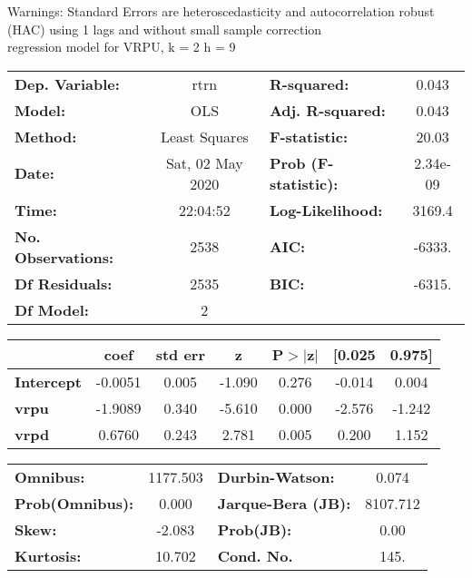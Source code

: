 Warnings: \newline
 [1] Standard Errors are heteroscedasticity and autocorrelation robust (HAC) using 1 lags and without small sample correction\\ 

regression model for VRPU, k = 2 h = 9\begin{center}
\begin{tabular}{lclc}
\toprule
\textbf{Dep. Variable:}    &       rtrn       & \textbf{  R-squared:         } &     0.043   \\
\textbf{Model:}            &       OLS        & \textbf{  Adj. R-squared:    } &     0.043   \\
\textbf{Method:}           &  Least Squares   & \textbf{  F-statistic:       } &     20.03   \\
\textbf{Date:}             & Sat, 02 May 2020 & \textbf{  Prob (F-statistic):} &  2.34e-09   \\
\textbf{Time:}             &     22:04:52     & \textbf{  Log-Likelihood:    } &    3169.4   \\
\textbf{No. Observations:} &        2538      & \textbf{  AIC:               } &    -6333.   \\
\textbf{Df Residuals:}     &        2535      & \textbf{  BIC:               } &    -6315.   \\
\textbf{Df Model:}         &           2      & \textbf{                     } &             \\
\bottomrule
\end{tabular}
\begin{tabular}{lcccccc}
                   & \textbf{coef} & \textbf{std err} & \textbf{z} & \textbf{P$> |$z$|$} & \textbf{[0.025} & \textbf{0.975]}  \\
\midrule
\textbf{Intercept} &      -0.0051  &        0.005     &    -1.090  &         0.276        &       -0.014    &        0.004     \\
\textbf{vrpu}      &      -1.9089  &        0.340     &    -5.610  &         0.000        &       -2.576    &       -1.242     \\
\textbf{vrpd}      &       0.6760  &        0.243     &     2.781  &         0.005        &        0.200    &        1.152     \\
\bottomrule
\end{tabular}
\begin{tabular}{lclc}
\textbf{Omnibus:}       & 1177.503 & \textbf{  Durbin-Watson:     } &    0.074  \\
\textbf{Prob(Omnibus):} &   0.000  & \textbf{  Jarque-Bera (JB):  } & 8107.712  \\
\textbf{Skew:}          &  -2.083  & \textbf{  Prob(JB):          } &     0.00  \\
\textbf{Kurtosis:}      &  10.702  & \textbf{  Cond. No.          } &     145.  \\
\bottomrule
\end{tabular}
\end{center}

